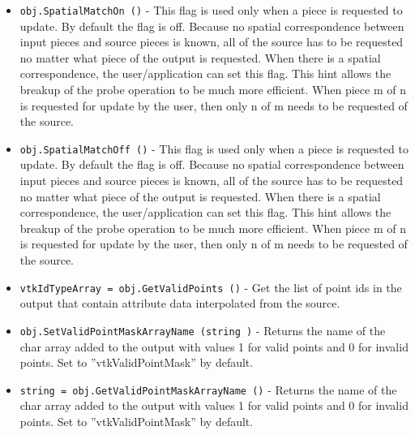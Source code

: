 \begin{itemize}
\item  \verb|obj.SpatialMatchOn ()| -  This flag is used only when a piece is requested to update.  By default
 the flag is off.  Because no spatial correspondence between input pieces
 and source pieces is known, all of the source has to be requested no
 matter what piece of the output is requested.  When there is a spatial 
 correspondence, the user/application can set this flag.  This hint allows
 the breakup of the probe operation to be much more efficient.  When piece
 m of n is requested for update by the user, then only n of m needs to
 be requested of the source. 

\item  \verb|obj.SpatialMatchOff ()| -  This flag is used only when a piece is requested to update.  By default
 the flag is off.  Because no spatial correspondence between input pieces
 and source pieces is known, all of the source has to be requested no
 matter what piece of the output is requested.  When there is a spatial 
 correspondence, the user/application can set this flag.  This hint allows
 the breakup of the probe operation to be much more efficient.  When piece
 m of n is requested for update by the user, then only n of m needs to
 be requested of the source. 

\item  \verb|vtkIdTypeArray = obj.GetValidPoints ()| -  Get the list of point ids in the output that contain attribute data
 interpolated from the source.

\item  \verb|obj.SetValidPointMaskArrayName (string )| -  Returns the name of the char array added to the output with values 1 for
 valid points and 0 for invalid points.
 Set to ''vtkValidPointMask'' by default.

\item  \verb|string = obj.GetValidPointMaskArrayName ()| -  Returns the name of the char array added to the output with values 1 for
 valid points and 0 for invalid points.
 Set to ''vtkValidPointMask'' by default.

\end{itemize}
